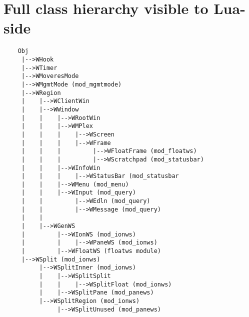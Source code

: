 \chapter{Full class hierarchy visible to Lua-side}
\label{app:fullhierarchy}
  
{\small
\begin{verbatim}
    Obj
     |-->WHook
     |-->WTimer
     |-->WMoveresMode
     |-->WMgmtMode (mod_mgmtmode)
     |-->WRegion
     |    |-->WClientWin
     |    |-->WWindow
     |    |    |-->WRootWin
     |    |    |-->WMPlex
     |    |    |    |-->WScreen
     |    |    |    |-->WFrame
     |    |    |         |-->WFloatFrame (mod_floatws)
     |    |    |         |-->WScratchpad (mod_statusbar)
     |    |    |-->WInfoWin
     |    |    |    |-->WStatusBar (mod_statusbar
     |    |    |-->WMenu (mod_menu)
     |    |    |-->WInput (mod_query)
     |    |         |-->WEdln (mod_query)
     |    |         |-->WMessage (mod_query)
     |    |
     |    |-->WGenWS
     |         |-->WIonWS (mod_ionws)
     |         |    |-->WPaneWS (mod_ionws)
     |         |-->WFloatWS (floatws module)
     |-->WSplit (mod_ionws)
          |-->WSplitInner (mod_ionws)
          |    |-->WSplitSplit
          |    |    |-->WSplitFloat (mod_ionws)
          |    |-->WSplitPane (mod_panews)
          |-->WSplitRegion (mod_ionws)
               |-->WSplitUnused (mod_panews)
\end{verbatim}
}
